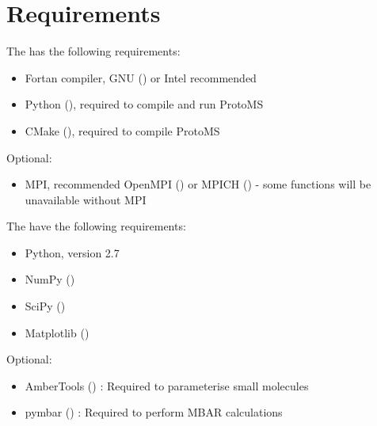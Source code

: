 \documentclass[letterpaper,10pt,english]{sphinxmanual}
\begin{document}
\section{Requirements}
\label{\detokenize{compilation:requirements}}
The  has the following requirements:
\begin{itemize}
\item {} 
Fortan compiler, GNU () or Intel recommended

\item {} 
Python (), required to compile and run ProtoMS

\item {} 
CMake (), required to compile ProtoMS

\end{itemize}

Optional:
\begin{itemize}
\item {} 
MPI, recommended OpenMPI () or MPICH () - some functions will be unavailable without MPI

\end{itemize}

The  have the following requirements:
\begin{itemize}
\item {} 
Python, version 2.7

\item {} 
NumPy ()

\item {} 
SciPy ()

\item {} 
Matplotlib ()

\end{itemize}

Optional:
\begin{itemize}
\item {} 
AmberTools ()          : Required to parameterise small molecules

\item {} 
pymbar () : Required to perform MBAR calculations

\end{itemize}
\end{document}
